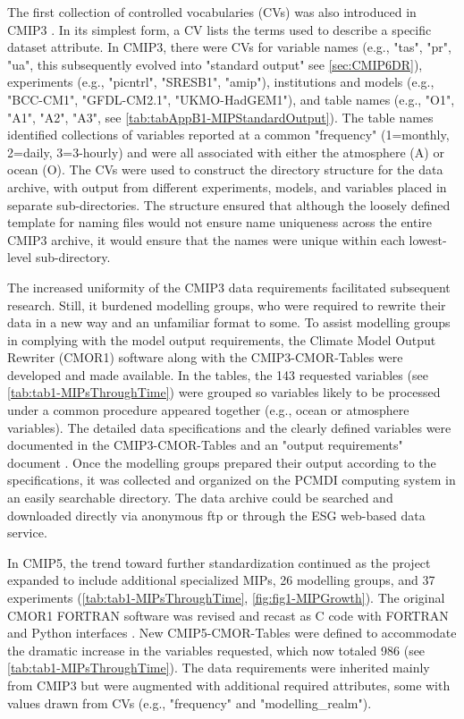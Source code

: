\documentclass[gmd, preprint]{copernicus}
\begin{document}
The first collection of controlled vocabularies (CVs) was also introduced in CMIP3 \citep[e.g.,][]{taylor_pcmdi_2005}. In its simplest form, a CV lists the terms used to describe a specific dataset attribute. In CMIP3, there were CVs for variable names (e.g., "tas", "pr", "ua", this subsequently evolved into "standard output" see \autoref{sec:CMIP6DR}), experiments (e.g., "picntrl", "SRESB1", "amip"), institutions and models (e.g., "BCC-CM1", "GFDL-CM2.1", "UKMO-HadGEM1"), and table names (e.g., "O1", "A1", "A2", "A3", see \autoref{tab:tabAppB1-MIPStandardOutput}). The table names identified collections of variables reported at a common "frequency" (1=monthly, 2=daily, 3=3-hourly) and were all associated with either the atmosphere (A) or ocean (O). The CVs were used to construct the directory structure for the data archive, with output from different experiments, models, and variables placed in separate sub-directories. The structure ensured that although the loosely defined template for naming files would not ensure name uniqueness across the entire CMIP3 archive, it would ensure that the names were unique within each lowest-level sub-directory.

The increased uniformity of the CMIP3 data requirements facilitated subsequent research. Still, it burdened modelling groups, who were required to rewrite their data in a new way and an unfamiliar format to some. To assist modelling groups in complying with the model output requirements, the Climate Model Output Rewriter (CMOR1) software \citep{taylor_cmor_2006} along with the CMIP3-CMOR-Tables \citep{doutriaux_cmip3_2005} were developed and made available. In the tables, the 143 requested variables (see \autoref{tab:tab1-MIPsThroughTime}) were grouped so variables likely to be processed under a common procedure appeared together (e.g., ocean or atmosphere variables). The detailed data specifications and the clearly defined variables were documented in the CMIP3-CMOR-Tables and an "output requirements" document \citep{taylor_pcmdi_2005}. Once the modelling groups prepared their output according to the specifications, it was collected and organized on the PCMDI computing system in an easily searchable directory. The data archive could be searched and downloaded directly via anonymous ftp or through the ESG web-based data service.

In CMIP5, the trend toward further standardization continued as the project expanded to include additional specialized MIPs, 26 modelling groups, and 37 experiments (\autoref{tab:tab1-MIPsThroughTime}, \autoref{fig:fig1-MIPGrowth}). The original CMOR1 FORTRAN software was revised and recast as C code with FORTRAN and Python interfaces \citep{doutriaux_cmor_2011}. New CMIP5-CMOR-Tables \citep{doutriaux_cmip5_2013} were defined to accommodate the dramatic increase in the variables requested, which now totaled 986 (see \autoref{tab:tab1-MIPsThroughTime}). The data requirements were inherited mainly from CMIP3 but were augmented with additional required attributes, some with values drawn from CVs (e.g., "frequency" and "modelling\_realm").
\end{document}
